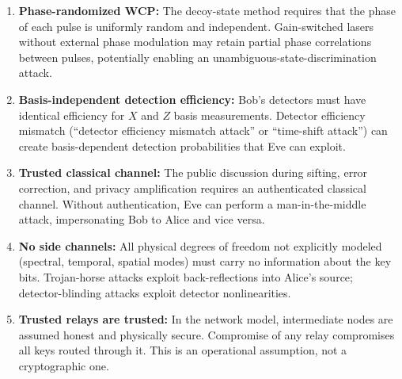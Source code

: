 \documentclass[11pt,a4paper,oneside]{report}
\begin{document}
\begin{enumerate}
\item \textbf{Phase-randomized WCP:} The decoy-state method requires that the phase of each pulse is uniformly random and independent. Gain-switched lasers without external phase modulation may retain partial phase correlations between pulses, potentially enabling an unambiguous-state-discrimination attack.

\item \textbf{Basis-independent detection efficiency:} Bob's detectors must have identical efficiency for $X$ and $Z$ basis measurements. Detector efficiency mismatch (``detector efficiency mismatch attack'' or ``time-shift attack'') can create basis-dependent detection probabilities that Eve can exploit.

\item \textbf{Trusted classical channel:} The public discussion during sifting, error correction, and privacy amplification requires an authenticated classical channel. Without authentication, Eve can perform a man-in-the-middle attack, impersonating Bob to Alice and vice versa.

\item \textbf{No side channels:} All physical degrees of freedom not explicitly modeled (spectral, temporal, spatial modes) must carry no information about the key bits. Trojan-horse attacks exploit back-reflections into Alice's source; detector-blinding attacks exploit detector nonlinearities.

\item \textbf{Trusted relays are trusted:} In the network model, intermediate nodes are assumed honest and physically secure. Compromise of any relay compromises all keys routed through it. This is an operational assumption, not a cryptographic one.
\end{enumerate}
\end{document}
